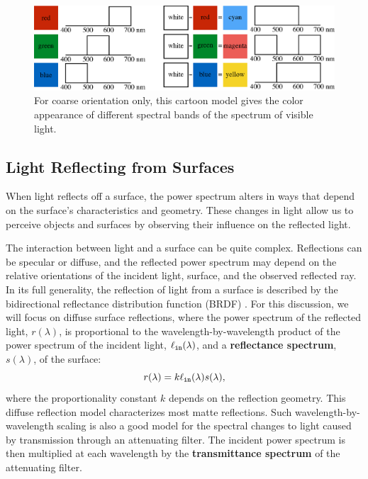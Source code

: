 \begin{figure}
\centerline{
\includegraphics[width=1.0\linewidth]{figures/color/cartoonColor2.eps}
}
\caption{For coarse orientation only, this cartoon model gives the color appearance of different spectral bands of the spectrum of visible light.}
\label{fig:names}
\end{figure}



\subsection{Light Reflecting from Surfaces}

When light reflects off a surface, the power spectrum alters in ways that depend on the surface’s characteristics and geometry. These
changes in light allow us to perceive objects and surfaces by observing their influence on the reflected light.

The interaction between light and a surface can be quite complex. Reflections can be specular or diffuse, and the reflected
power spectrum may depend on the relative orientations of the incident
light, surface, and the observed reflected ray. In its full generality, the reflection of light from a surface is described by the
bidirectional reflectance distribution function (BRDF) \cite{Nicodemus1965,Matusik2002}.
For this discussion, we will focus on diffuse
surface reflections, where the power spectrum of the reflected light, $r(\lambda)$,
is proportional to the wavelength-by-wavelength product of the power
spectrum of the incident light, $\ell_{\texttt{in}} (\lambda)$, and a {\bf reflectance
  spectrum}, $s(\lambda)$, of the surface:
\begin{equation}
r(\lambda) = k \ell_{\texttt{in}} (\lambda) s(\lambda),
\end{equation}
where the proportionality constant $k$ depends on the reflection geometry.
This diffuse reflection model characterizes
most matte reflections.  Such wavelength-by-wavelength scaling
is also a good model for the spectral changes to light caused by transmission
through an attenuating filter.  The incident power spectrum is
then multiplied at each wavelength by the {\bf transmittance spectrum} of
the attenuating filter.

